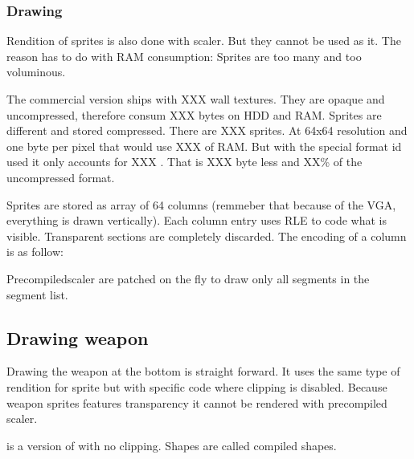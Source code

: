 \subsubsection{Drawing}
Rendition of sprites is also done with scaler. But they cannot be used as it. The reason has to do with RAM consumption: Sprites are too many and too voluminous.\\
\par
The commercial version ships with XXX wall textures. They are opaque and uncompressed, therefore consum XXX bytes on HDD and RAM. Sprites are different and stored compressed. There are XXX sprites. At 64x64 resolution and one byte per pixel that would use XXX of RAM. But with the special format id used it only accounts for XXX . That is XXX byte less and XX\% of the uncompressed format.\\
\par
Sprites are stored as array of 64 columns (remmeber that because of the VGA, everything is drawn vertically). Each column entry uses RLE to code what is visible. Transparent sections are completely discarded. The encoding of a column is as follow:\\
\par
Precompiledscaler are patched on the fly to draw only all segments in the segment list.









\subsection{Drawing weapon}
Drawing the weapon at the bottom is straight forward. It uses the same type of rendition for sprite but with specific code where clipping is disabled. Because weapon sprites features transparency it cannot be rendered with precompiled scaler.\\ 
\par
{} is a version of  with no clipping. Shapes are called compiled shapes.\\
















